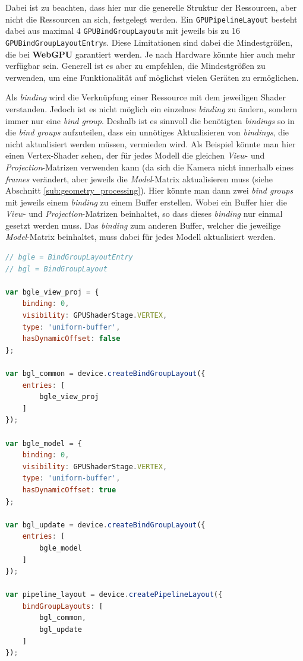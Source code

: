 \documentclass[oneside]{ausarbeitung}
\begin{document}
Dabei ist zu beachten, dass hier nur die generelle Struktur der Ressourcen, aber nicht die Ressourcen an sich, festgelegt werden. Ein \texttt{GPUPipelineLayout} besteht dabei aus maximal 4 \texttt{GPUBindGroupLayout}s mit jeweils bis zu 16 \texttt{GPUBindGroupLayoutEntry}s. Diese Limitationen sind dabei die Mindestgrößen, die bei \textbf{WebGPU} garantiert werden. Je nach Hardware könnte hier auch mehr verfügbar sein. Generell ist es aber zu empfehlen, die Mindestgrößen zu verwenden, um eine Funktionalität auf möglichst vielen Geräten zu ermöglichen.

Als \textit{binding} wird die Verknüpfung einer Ressource mit dem jeweiligen Shader verstanden. Jedoch ist es nicht möglich ein einzelnes \textit{binding} zu ändern, sondern immer nur eine \textit{bind group}. Deshalb ist es sinnvoll die benötigten \textit{bindings} so in die \textit{bind groups} aufzuteilen, dass ein unnötiges Aktualisieren von \textit{bindings}, die nicht aktualisiert werden müssen, vermieden wird. Als Beispiel könnte man hier einen Vertex-Shader sehen, der für jedes Modell die gleichen \textit{View}- und \textit{Projection}-Matrizen verwenden kann (da sich die Kamera nicht innerhalb eines \textit{frames} verändert, aber jeweils die \textit{Model}-Matrix aktualisieren muss (siehe Abschnitt \ref{sub:geometry_processing}). Hier könnte man dann zwei \textit{bind groups} mit jeweils einem \textit{binding} zu einem Buffer erstellen. Wobei ein Buffer hier die \textit{View}- und \textit{Projection}-Matrizen beinhaltet, so dass dieses \textit{binding} nur einmal gesetzt werden muss. Das \textit{binding} zum anderen Buffer, welcher die jeweilige \textit{Model}-Matrix beinhaltet, muss dabei für jedes Modell aktualisiert werden.

\begin{minipage}{\textwidth}
\begin{lstlisting}[language=JavaScript]
// bgle = BindGroupLayoutEntry
// bgl = BindGroupLayout

var bgle_view_proj = {
    binding: 0,
    visibility: GPUShaderStage.VERTEX,
    type: 'uniform-buffer',
    hasDynamicOffset: false
};

var bgl_common = device.createBindGroupLayout({
    entries: [
        bgle_view_proj
    ]
});

var bgle_model = {
    binding: 0,
    visibility: GPUShaderStage.VERTEX,
    type: 'uniform-buffer',
    hasDynamicOffset: true
};

var bgl_update = device.createBindGroupLayout({
    entries: [
        bgle_model
    ]
});

var pipeline_layout = device.createPipelineLayout({
    bindGroupLayouts: [
        bgl_common,
        bgl_update
    ]
});
\end{lstlisting}
\end{minipage}
\end{document}
